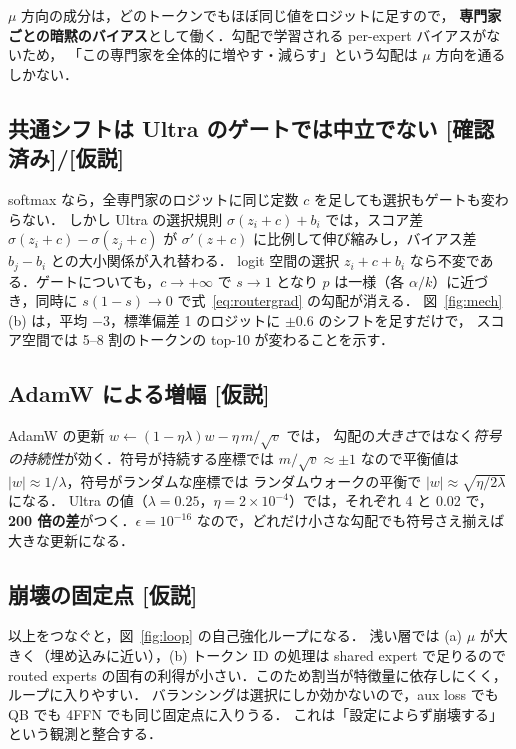\documentclass[a4paper,11pt]{ltjsarticle}
\theoremstyle{definition}
\theoremstyle{plain}
\newcommand{\Ver}{\textsf{\textcolor{cG}{[確認済み]}}}
\newcommand{\Hyp}{\textsf{\textcolor{cO}{[仮説]}}}
\begin{document}
$\mu$ 方向の成分は，どのトークンでもほぼ同じ値をロジットに足すので，
\textbf{専門家ごとの暗黙のバイアス}として働く．勾配で学習される per-expert バイアスがないため，
「この専門家を全体的に増やす・減らす」という勾配は $\mu$ 方向を通るしかない．

\subsection{共通シフトは Ultra のゲートでは中立でない \Ver{}/\Hyp}
softmax なら，全専門家のロジットに同じ定数 $c$ を足しても選択もゲートも変わらない．
しかし Ultra の選択規則 $\sigma(z_i+c)+b_i$ では，スコア差 $\sigma(z_i+c)-\sigma(z_j+c)$ が
$\sigma'(z+c)$ に比例して伸び縮みし，バイアス差 $b_j-b_i$ との大小関係が入れ替わる．
logit 空間の選択 $z_i+c+b_i$ なら不変である．ゲートについても，$c\to+\infty$ で $s\to1$ となり
$p$ は一様（各 $\alpha/k$）に近づき，同時に $s(1-s)\to0$ で式~\eqref{eq:routergrad} の勾配が消える．
図~\ref{fig:mech}(b) は，平均 $-3$，標準偏差 1 のロジットに $\pm0.6$ のシフトを足すだけで，
スコア空間では 5--8 割のトークンの top-10 が変わることを示す．

\subsection{AdamW による増幅 \Hyp}
AdamW の更新 $w\leftarrow(1-\eta\lambda)w-\eta\,m/\sqrt v$ では，
勾配の\emph{大きさ}ではなく\emph{符号の持続性}が効く．符号が持続する座標では
$m/\sqrt v\approx\pm1$ なので平衡値は $|w|\approx1/\lambda$，符号がランダムな座標では
ランダムウォークの平衡で $|w|\approx\sqrt{\eta/2\lambda}$ になる．
Ultra の値（$\lambda=0.25$，$\eta=2\times10^{-4}$）では，それぞれ 4 と 0.02 で，
\textbf{200 倍の差}がつく．$\epsilon=10^{-16}$ なので，どれだけ小さな勾配でも符号さえ揃えば大きな更新になる．

\subsection{崩壊の固定点 \Hyp}
以上をつなぐと，図~\ref{fig:loop} の自己強化ループになる．
浅い層では (a) $\mu$ が大きく（埋め込みに近い），(b) トークン ID の処理は shared expert で足りるので
routed experts の固有の利得が小さい．このため割当が特徴量に依存しにくく，ループに入りやすい．
バランシングは選択にしか効かないので，aux loss でも QB でも 4FFN でも同じ固定点に入りうる．
これは「設定によらず崩壊する」という観測と整合する．
\end{document}

